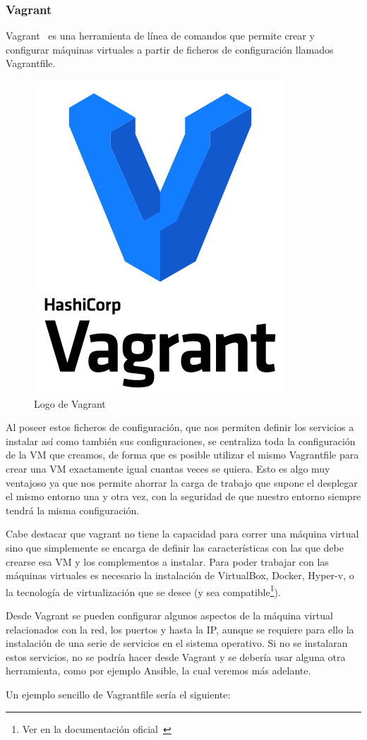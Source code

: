 \subsubsection{Vagrant}
	Vagrant~\cite{vagrant} es una herramienta de línea de comandos que permite crear y configurar máquinas virtuales a partir de ficheros de configuración llamados Vagrantfile.

	\begin{figure}[h]
	\centering
	\includegraphics[width=0.2 \textwidth]{../imgs/EdA/vagrant.png}
	\caption{Logo de Vagrant}
	\label{fig:vagrant}
	\end{figure}

	Al poseer estos ficheros de configuración, que nos permiten definir los servicios a instalar así como también sus configuraciones, se centraliza toda la configuración de la VM que creamos, de forma que es  posible  utilizar el mismo Vagrantfile para crear una VM exactamente igual cuantas veces se quiera. Esto es algo muy ventajoso ya que nos permite ahorrar la carga de trabajo que supone el desplegar el mismo entorno una y otra vez, con la seguridad de que nuestro entorno siempre tendrá la misma configuración.

	Cabe destacar que vagrant no tiene la capacidad para correr una máquina virtual sino que simplemente se encarga de definir las características con las que debe crearse esa VM y los complementos a instalar. Para poder trabajar con las máquinas virtuales es necesario la instalación de VirtualBox, Docker, Hyper-v, o la tecnología de virtualización que se desee (y sea compatible\footnote{Ver en la documentación oficial~\cite{vagrant}}).

	\clearpage
	Desde Vagrant se pueden configurar algunos aspectos de la máquina virtual relacionados con la red, los puertos y hasta la IP, aunque se requiere para ello la instalación de una serie de servicios en el sistema operativo. Si no se instalaran estos servicios, no se podría hacer desde Vagrant y se debería usar alguna otra herramienta, como por ejemplo Ansible, la cual veremos más adelante.

	Un ejemplo sencillo de Vagrantfile sería el siguiente:~\cite{vagrant2}

